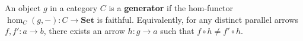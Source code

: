 An object $g$ in a category $C$ is a \textbf{generator} if the hom-functor $\hom_C(g, -): C \rightarrow \mathbf{Set}$ is faithful. Equivalently, for any distinct parallel arrows $f, f': a \rightarrow b$, there exists an arrow $h: g \rightarrow a$ such that $f \circ h \neq f' \circ h$.